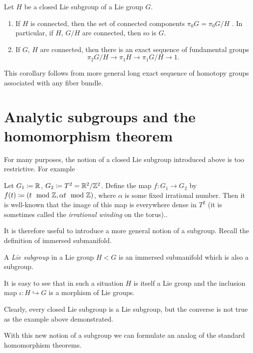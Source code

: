 \begin{corollary}
  Let $H$ be a closed Lie subgroup of a Lie group $G$.
  \begin{enumerate}[label=\textnormal{(\arabic*)}]
  \item If $H$ is connected, then the set of connected components
    $\pi_0G=\pi_0G/H$ . In particular, if $H$, $G/H$ are connected, then so
    is $G$.
  \item If $G$, $H$ are connected, then there is an exact sequence of
    fundamental groups
    \[
      \pi_2G/H\longrightarrow
      \pi_1H\longrightarrow
      \pi_1G/H\longrightarrow
      1.
    \]
  \end{enumerate}
\end{corollary}
This corollary follows from more general long exact sequence of homotopy
groups associated with any fiber bundle.

\section{Analytic subgroups and the homomorphism theorem}
For many purposes, the notion of a closed Lie subgroup introduced above is
too restrictive. For example
\begin{example}
Let $G_1\coloneq\mathbb{R}$, $G_2\coloneq T^2=\mathbb{R}^2/\mathbb{Z}^2$. Define the map
$f\colon G_1\to G_2$ by $f(t)\coloneq(t\mod{\mathbb{Z}},\alpha t\mod{\mathbb{Z}})$, where
$\alpha$ is some fixed irrational number. Then it is well-known that the
image of this map is everywhere dense in $T^2$ (it is sometimes called the
\emph{irrational winding} on the torus)..
\end{example}

It is therefore useful to introduce a more general notion of a
subgroup. Recall the definition of immersed submanifold.

\begin{definition}
  A \emph{Lie subgroup} in a Lie  group $H<G$ is an immersed submanifold
  which is also a subgroup.
\end{definition}

It is easy to see that in such a situation $H$ is itself a Lie group and
the inclusion map $\iota\colon H\hookrightarrow G$ is a morphism of Lie
groups.

Clearly, every closed Lie subgroup is a Lie subgroup, but the converse is
not true as the example above demonstrated.

With this new notion of a subgroup we can formulate an analog of the
standard homomorphism theorems.

